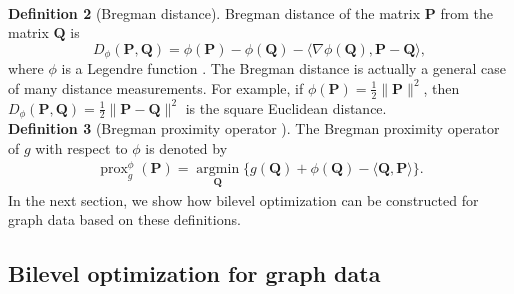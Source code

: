 \documentclass{article}
\begin{document}
\\[7pt]
\textbf{Definition 2} (Bregman distance\cite{dhillon2008matrix}).
Bregman distance of the matrix $\mathbf{P}$ from the matrix $\mathbf{Q}$ is
$$D_{\phi} (\mathbf P, \mathbf Q)=\phi(\mathbf P)-\phi(\mathbf Q)- \langle \nabla \phi (\mathbf Q), \mathbf P-\mathbf Q \rangle,$$
where $\phi$ is a Legendre function \cite{bauschke2018breg}. The Bregman distance is actually a general case of many distance measurements. For example, if $\phi(\mathbf{P})=\frac{1}{2} \lVert \mathbf P \rVert^2$, then $D_{\phi} (\mathbf P, \mathbf Q)=\frac{1}{2} \lVert \mathbf P-\mathbf Q \rVert^2$ is the square Euclidean distance.
\\[7pt]
\textbf{Definition 3} (Bregman proximity operator \cite{van2017forward}).
The Bregman proximity operator of $g$ with respect to $\phi$ is denoted by
\begin{align}\label{proximity_operator}
    \operatorname{prox}_g^{\phi}(\mathbf P)=\underset{\mathbf Q}{\operatorname{argmin}} \{g(\mathbf Q)+\phi(\mathbf Q)-\langle \mathbf Q, \mathbf P\rangle \}.
\end{align}
In the next section, we show how bilevel optimization can be constructed for graph data based on these definitions.


\subsection{Bilevel optimization for graph data}\label{SubSec:2.2}
\end{document}
